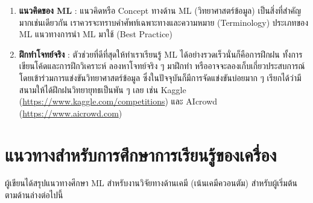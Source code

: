 \begin{enumerate}
    \item \textbf{แนวคิดของ ML} : แนวคิดหรือ Concept ทางด้าน ML (วิทยาศาสตร์ข้อมูล) เป็นสิ่งที่สำคัญมากเช่นเดียวกัน
    เราควรจะทราบคำศัพท์เฉพาะทางและความหมาย (Terminology) ประเภทของ ML แนวทางการนำ ML มาใช้ (Best Practice)
    
    \item \textbf{ฝึกทำโจทย์จริง} : ตัวช่วยที่ดีที่สุดให้ทำเราเรียนรู้ ML ได้อย่างรวดเร็วนั่นก็คือการฝึกฝน ทั้งการเขียนโค้ดและการฝึกวิเคราะห์ 
    ลองหาโจทย์จริง ๆ มาฝึกทำ หรืออาจจะลองเก็บเกี่ยวประสบการณ์โดยเข้าร่วมการแข่งขันวิทยาศาสตร์ข้อมูล ซึ่งในปัจจุบันก็มีการจัดแข่งขันบ่อยมาก ๆ 
    เรียกได้ว่ามีสนามให้ได้ฝึกฝนวิทยายุทธเป็นพัน ๆ เลย เช่น Kaggle (\url{https://www.kaggle.com/competitions}) และ
    AIcrowd (\url{https://www.aicrowd.com}) 
\end{enumerate}

\section{แนวทางสำหรับการศึกษาการเรียนรู้ของเครื่อง}
\label{sec:learn_ml}

ผู้เขียนได้สรุปแนวทางศึกษา ML สำหรับงานวิจัยทางด้านเคมี (เน้นเคมีควอนตัม) สำหรับผู้เริ่มต้นตามด้านล่างต่อไปนี้

